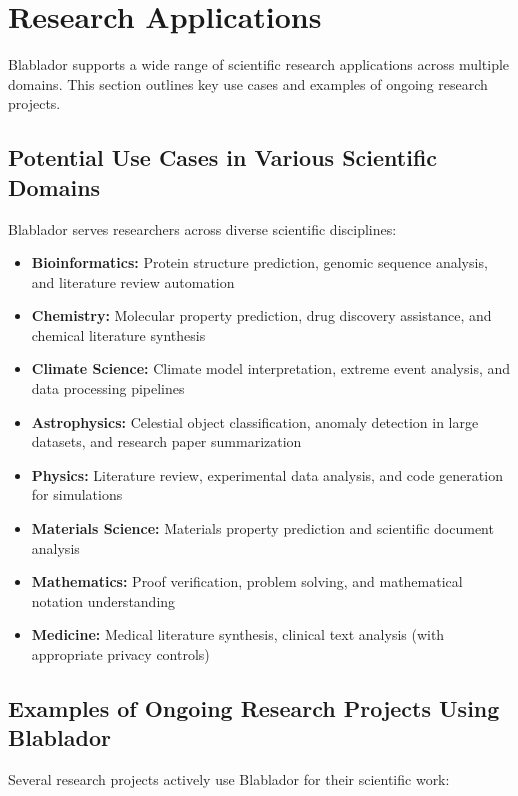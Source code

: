 \documentclass[10pt,conference]{IEEEtran}
\begin{document}
\section{Research Applications}

Blablador supports a wide range of scientific research applications across multiple domains. This section outlines key use cases and examples of ongoing research projects.

\subsection{Potential Use Cases in Various Scientific Domains}

Blablador serves researchers across diverse scientific disciplines:

\begin{itemize}
    \item \textbf{Bioinformatics:} Protein structure prediction, genomic sequence analysis, and literature review automation
    \item \textbf{Chemistry:} Molecular property prediction, drug discovery assistance, and chemical literature synthesis
    \item \textbf{Climate Science:} Climate model interpretation, extreme event analysis, and data processing pipelines
    \item \textbf{Astrophysics:} Celestial object classification, anomaly detection in large datasets, and research paper summarization
    \item \textbf{Physics:} Literature review, experimental data analysis, and code generation for simulations
    \item \textbf{Materials Science:} Materials property prediction and scientific document analysis
    \item \textbf{Mathematics:} Proof verification, problem solving, and mathematical notation understanding
    \item \textbf{Medicine:} Medical literature synthesis, clinical text analysis (with appropriate privacy controls)
\end{itemize}

\subsection{Examples of Ongoing Research Projects Using Blablador}

Several research projects actively use Blablador for their scientific work:
\end{document}
